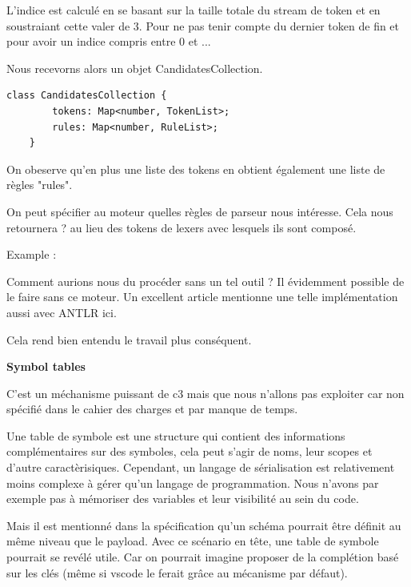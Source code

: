 \documentclass[
    iict, %
    il, %
]{heig-tb}
\begin{document}
L'indice est calculé en se basant sur la taille totale du stream de token et en soustraiant cette valer de 3.
Pour ne pas tenir compte du dernier token de fin et pour avoir un indice compris entre 0 et ...

Nous recevorns alors un objet CandidatesCollection.

\begin{lstlisting}[frame=single]
    class CandidatesCollection {
        tokens: Map<number, TokenList>;
        rules: Map<number, RuleList>;
    }
\end{lstlisting}


On obeserve qu'en plus une liste des tokens en obtient également une liste de règles "rules".


On peut spécifier au moteur quelles règles de parseur nous intéresse. Cela nous retournera ? au lieu des tokens de lexers avec lesquels ils sont composé.

Example :


Comment aurions nous du procéder sans un tel outil ?
Il évidemment possible de le faire sans ce moteur. Un excellent article mentionne une telle implémentation aussi avec ANTLR ici.

Cela rend bien entendu le travail plus conséquent.



\textbf{Symbol tables}

C'est un méchanisme puissant de c3 mais que nous n'allons pas exploiter car non spécifié dans le cahier des charges et par manque de temps.

Une table de symbole est une structure qui contient des informations complémentaires sur des symboles, cela peut s'agir de noms, leur scopes et d'autre caractèrisiques.
Cependant, un langage de sérialisation est relativement moins complexe à gérer qu'un langage de programmation.
Nous n'avons par exemple pas à mémoriser des variables et leur visibilité au sein du code.

Mais il est mentionné dans la spécification qu'un schéma pourrait être définit au même niveau que le payload.
Avec ce scénario en tête, une table de symbole pourrait se revélé utile.
Car on pourrait imagine proposer de la complétion basé sur les clés (même si vscode le ferait grâce au mécanisme par défaut). %
\end{document}
